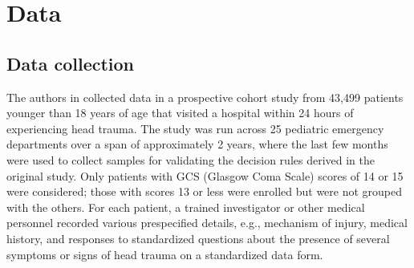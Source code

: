 \documentclass[11pt, letterpaper]{amsart}
\let\Oldsection\section
\renewcommand{\section}{\FloatBarrier\Oldsection}
\let\Oldsubsection\subsection
\renewcommand{\subsection}{\FloatBarrier\Oldsubsection}
\begin{document}
\section{Data}\label{sec:data}

\subsection{Data collection} \label{ssec:datacollect}


The authors in \cite{kuppermann2009identification} collected data in a prospective cohort study from 43,499 patients younger than 18 years of age that visited a hospital within 24 hours of experiencing head trauma. The study was run across 25 pediatric emergency departments over a span of approximately 2 years, where the last few months were used to collect samples for validating the decision rules derived in the original study. Only patients with GCS (Glasgow Coma Scale) scores of 14 or 15 were considered; those with scores 13 or less were enrolled but were not grouped with the others. For each patient, a trained investigator or other medical personnel recorded various prespecified details, e.g., mechanism of injury, medical history, and responses to standardized questions about the presence of several symptoms or signs of head trauma on a standardized data form. 
\end{document}
